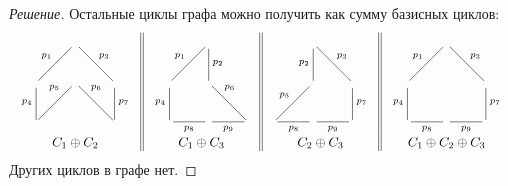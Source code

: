 \begin{proof}[Решение]
    Остальные циклы графа можно получить как сумму базисных циклов:
    \[
        \begin{tabular}{c||c||c||c}
            {\xymatrix{
                *{} 
                    &{} \ar@{-}[dl]_{p_1} \ar@{-}[dr]^{p_3}
                        &*{}
                            \\
                {} \ar@{-}[d]_{p_4} 
                    &{} \ar@{-}[dl]_(.3){p_5} \ar@{-}[dr]^(.3){p_6} 
                        &{} \ar@{-}[d]^{p_7} 
                            \\
                {} 
                    &{}
                        &{}
            }}
            &
                {\xymatrix{
                    *{} 
                        &{} \ar@{-}[dl]_{p_1} \ar@{-}[d]^{p_2}
                            &*{}
                                \\
                    {} \ar@{-}[d]_{p_4} 
                        &{} \ar@{-}[dr]^(.3){p_6} 
                            &{} 
                                \\
                    {} \ar@{-}[r]_{p_8} 
                        &{} \ar@{-}[r]_{p_9} 
                            &{}
                }}
                &
                    {\xymatrix{
                        *{} 
                            &{}  \ar@{-}[d]_{p_2} \ar@{-}[dr]^{p_3}
                                &*{}
                                    \\
                        {} 
                            &{} \ar@{-}[dl]_{p_5} 
                                &{} \ar@{-}[d]^{p_7} 
                                    \\
                        {} \ar@{-}[r]_{p_8} 
                            &{} \ar@{-}[r]_{p_9} 
                                &{}
                    }}
                    &
                        {\xymatrix{
                            *{} 
                                &{} \ar@{-}[dl]_{p_1}  \ar@{-}[dr]^{p_3}
                                    &*{}
                                        \\
                            {} \ar@{-}[d]_{p_4} 
                                &{} 
                                    &{} \ar@{-}[d]^{p_7} 
                                        \\
                            {} \ar@{-}[r]_{p_8} 
                                &{} \ar@{-}[r]_{p_9} 
                                    &{}
                        }}
                            \\
            $C_1\oplus C_2$&$C_1\oplus C_3$&$C_2\oplus C_3$&$C_1\oplus C_2\oplus C_3$
        \end{tabular}
    \]
    Других циклов в графе нет.
\end{proof}

